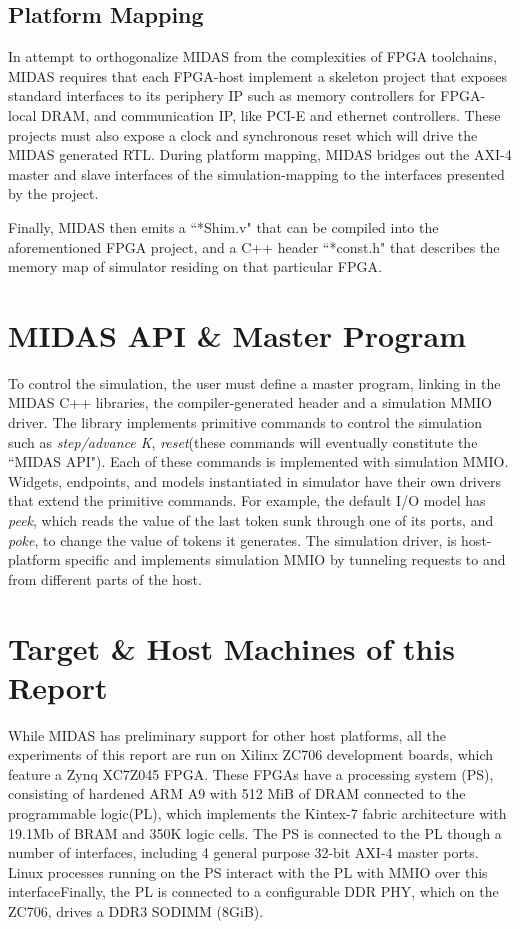 \subsection{Platform Mapping}

In attempt to orthogonalize MIDAS from the complexities of FPGA toolchains,
MIDAS requires that each FPGA-host implement a skeleton project that exposes
standard interfaces to its periphery IP such as memory controllers for
FPGA-local DRAM, and communication IP, like PCI-E and ethernet controllers.
These projects must also expose a clock and synchronous reset which will drive
the MIDAS generated RTL.  During platform mapping, MIDAS bridges out the AXI-4
master and slave interfaces of the simulation-mapping to the interfaces
presented by the project.

Finally, MIDAS then emits a ``*Shim.v" that can be compiled into the
aforementioned FPGA project, and a C++ header ``*const.h" that describes the
memory map of simulator residing on that particular FPGA.

\section{MIDAS API \& Master Program}

To control the simulation, the user must define a master program, linking in
the MIDAS C++ libraries, the compiler-generated header and a simulation MMIO
driver.  The library implements primitive commands to control the simulation
such as \emph{step/advance K}, \emph{reset}(these commands will eventually
constitute the ``MIDAS API"). Each of these commands is implemented with
simulation MMIO.  Widgets, endpoints, and models instantiated in simulator have
their own drivers that extend the primitive commands.  For example, the default
I/O model has \emph{peek}, which reads the value of the last token sunk through
one of its ports, and \emph{poke}, to change the value of tokens it generates.  The
simulation driver, is host-platform specific and implements simulation MMIO by
tunneling requests to and from different parts of the host.

\section{Target \& Host Machines of this Report}\label{sec:targetandhostmachines}

While MIDAS has preliminary support for other host platforms, all the
experiments of this report are run on Xilinx ZC706 development boards, which
feature a Zynq XC7Z045 FPGA. These FPGAs have a processing system (PS),
consisting of hardened ARM A9 with 512 MiB of DRAM connected to the
programmable logic(PL), which implements the Kintex-7 fabric architecture with
19.1Mb of BRAM and 350K logic cells. The PS is connected to the PL though a
number of interfaces, including 4 general purpose 32-bit AXI-4 master ports.
Linux processes running on the PS interact with the PL with MMIO over this
interfaceFinally, the PL is connected to a configurable DDR PHY, which on the
ZC706, drives a DDR3 SODIMM (8GiB).

